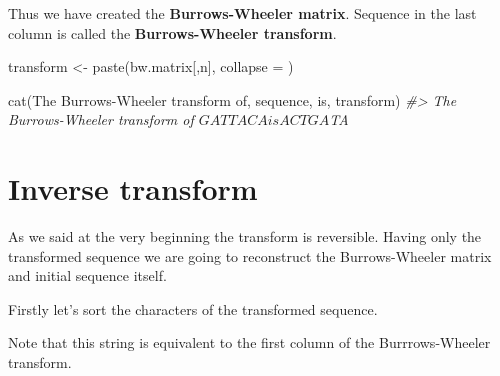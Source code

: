 \documentclass[
]{book}
\newenvironment{Shaded}{\begin{snugshade}}{\end{snugshade}}
\newcommand{\AttributeTok}[1]{\textcolor[rgb]{0.77,0.63,0.00}{#1}}
\newcommand{\CommentTok}[1]{\textcolor[rgb]{0.56,0.35,0.01}{\textit{#1}}}
\newcommand{\DecValTok}[1]{\textcolor[rgb]{0.00,0.00,0.81}{#1}}
\newcommand{\FunctionTok}[1]{\textcolor[rgb]{0.00,0.00,0.00}{#1}}
\newcommand{\NormalTok}[1]{#1}
\newcommand{\OtherTok}[1]{\textcolor[rgb]{0.56,0.35,0.01}{#1}}
\newcommand{\SpecialCharTok}[1]{\textcolor[rgb]{0.00,0.00,0.00}{#1}}
\newcommand{\StringTok}[1]{\textcolor[rgb]{0.31,0.60,0.02}{#1}}
\begin{document}
Thus we have created the \textbf{Burrows-Wheeler matrix}. Sequence in the last column is called the \textbf{Burrows-Wheeler transform}.

\begin{Shaded}
\begin{Highlighting}[numbers=left,,]
\NormalTok{transform }\OtherTok{\textless{}{-}} \FunctionTok{paste}\NormalTok{(bw.matrix[,n], }\AttributeTok{collapse =} \StringTok{\textquotesingle{}\textquotesingle{}}\NormalTok{)}

\FunctionTok{cat}\NormalTok{(}\StringTok{\textquotesingle{}The Burrows{-}Wheeler transform of\textquotesingle{}}\NormalTok{, }
\NormalTok{    sequence, }\StringTok{\textquotesingle{}is\textquotesingle{}}\NormalTok{, transform)}
\CommentTok{\#\textgreater{} The Burrows{-}Wheeler transform of $GATTACA is ACTGA$TA}
\end{Highlighting}
\end{Shaded}

\hypertarget{inverse-transform}{%
\section{Inverse transform}\label{inverse-transform}}

As we said at the very beginning the transform is reversible. Having only the transformed sequence we are going to reconstruct the Burrows-Wheeler matrix and initial sequence itself.

Firstly let's sort the characters of the transformed sequence.

\begin{Shaded}
\end{Shaded}

Note that this string is equivalent to the first column of the Burrrows-Wheeler transform.
\end{document}
